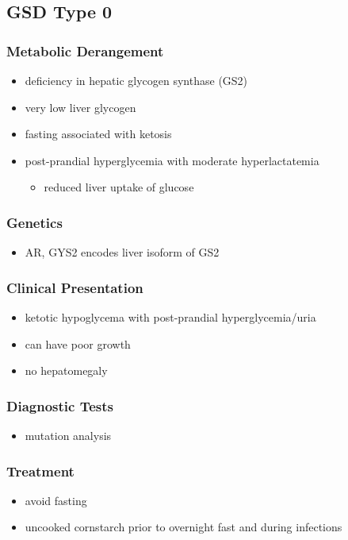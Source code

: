 \documentclass{scrartcl}
\begin{document}
\subsection{GSD Type 0}
\label{sec:orga66bebc}
\subsubsection{Metabolic Derangement}
\label{sec:org829c38a}
\begin{itemize}
\item deficiency in hepatic glycogen synthase (GS2)
\item very low liver glycogen
\item fasting associated with ketosis
\item post-prandial hyperglycemia with moderate hyperlactatemia
\begin{itemize}
\item reduced liver uptake of glucose
\end{itemize}
\end{itemize}

\subsubsection{Genetics}
\label{sec:orgfed89f8}
\begin{itemize}
\item AR, GYS2 encodes liver isoform of GS2
\end{itemize}

\subsubsection{Clinical Presentation}
\label{sec:orgd75775d}
\begin{itemize}
\item ketotic hypoglycema with post-prandial hyperglycemia/uria
\item can have poor growth
\item no hepatomegaly
\end{itemize}

\subsubsection{Diagnostic Tests}
\label{sec:org5c344ff}
\begin{itemize}
\item mutation analysis
\end{itemize}
\subsubsection{Treatment}
\label{sec:org72a9754}
\begin{itemize}
\item avoid fasting
\item uncooked cornstarch prior to overnight fast and during infections
\end{itemize}
\end{document}
